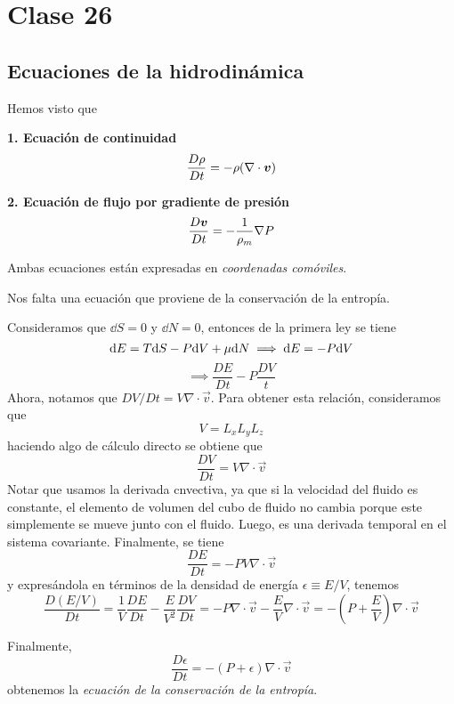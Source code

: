 \section{Clase 26}
\subsection{Ecuaciones de la hidrodinámica}
Hemos visto que

\begin{tcolorbox}
\textbf{1. Ecuación de continuidad}
\begin{equation}\label{26.1}
  \frac{D \rho }{D t}=-\rho (\nabla\cdot \vb*{v})
\end{equation}

\textbf{2. Ecuación de flujo por gradiente de presión}
\begin{equation}\label{26.2}
  \frac{D\vb*{v}}{D t}=-\frac{1}{\rho_m}\nabla P
\end{equation}
\end{tcolorbox}
Ambas ecuaciones están expresadas en \textit{coordenadas comóviles}.

Nos falta una ecuación que proviene de la conservación de la entropía. 

Consideramos que $\dd S=0$ y $\dd N=0$, entonces de la primera ley se tiene
\begin{equation}
  \dd E=T\dd S-P\dd V+\mu\dd N \implies \dd E=-P\dd V
\end{equation}
\begin{equation}
  \implies\boxed{ \frac{D E}{D t}-P\frac{D V}{t}}
\end{equation}
Ahora, notamos que $D V/Dt=V\nabla\cdot\vec{v}$. Para obtener esta relación, consideramos que
\begin{equation}
  V=L_xL_yL_z
\end{equation}
haciendo algo de cálculo directo se obtiene que
\begin{equation}
\boxed{  \frac{D V}{D t}=V\nabla\cdot\vec{v}}
\end{equation}
Notar que usamos la derivada cnvectiva, ya que si la velocidad del fluido es constante, el elemento de volumen del cubo de fluido no cambia porque este simplemente se mueve junto con el fluido. Luego, es una derivada temporal en el sistema covariante. Finalmente, se tiene
\begin{equation}
  \frac{D E}{Dt}=-PV\nabla\cdot\vec{v}
\end{equation}
y expresándola en términos de la densidad de energía $\epsilon\equiv E/V$, tenemos
\begin{equation}
  \frac{D(E/V)}{D t}=\frac{1}{V}\frac{DE}{Dt}-\frac{E}{V^2}\frac{DV}{Dt}=-P\nabla\cdot\vec{v}-\frac{E}{V}\nabla\cdot\vec{v}=-\left(P+\frac{E}{V}\right)\nabla\cdot\vec{v}
\end{equation}
\begin{tcolorbox}
Finalmente,
\begin{equation}\label{26.3}
\boxed{  \frac{D\epsilon}{Dt}=-(P+\epsilon)\nabla\cdot\vec{v}}
\end{equation}
obtenemos la \textit{ecuación de la conservación de la entropía}.
\end{tcolorbox}

